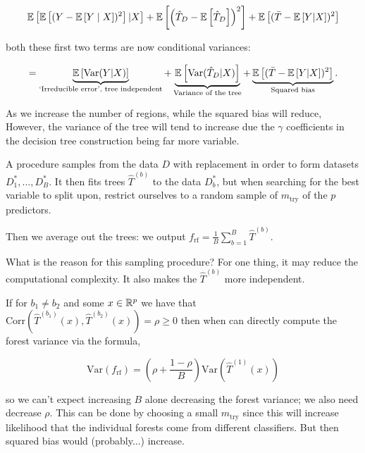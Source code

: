 \documentclass[11pt]{scrartcl}
\begin{document}
\begin{align}
    \mathbb{E} \left[ \mathbb{E} \left[ (Y-\mathbb{E} \left[ Y \mid X \right])^2 \right] | X \right] + \mathbb{E} \left[ \left(\hat{T}_D - \mathbb{E} \left[ \hat{T}_D \right]\right)^2 \right] + \mathbb{E} \left[ (\bar{T} - \mathbb{E} \left[ Y|X \right])^2 \right]
\end{align} 

both these first two terms are now conditional variances:

\begin{align}
    = \underbrace{\mathbb{E} \left[ \text{Var} (Y|X)  \right]}_ {\text{`Irreducible error', tree independent}} + \underbrace{\mathbb{E} \left[ \text{Var} (\hat{T}_D | X) \right]}_{\text{Variance of the tree}} + \underbrace{\mathbb{E} \left[  (\bar{T} - \mathbb{E} \left[ Y|X \right])^2  \right]}_{\text{Squared bias}}.
\end{align}

As we increase the number of regions, while the squared bias will reduce, However, the variance of the tree will tend to increase due the $\gamma$ coefficients in the decision tree construction being far more variable.

\begin{definition}
A  procedure samples from the data $D$ with replacement in order to form datasets $D_1^*, ... , D_B^*$. It then fits trees $\hat{T}^{(b)}$ to the data $D_b^*$, but when searching for the best variable to split upon, restrict ourselves to a random sample of $m_{\text{try}}$ of the $p$ predictors.

Then we average out the trees: we output $f_{\text{rf}} = \frac1B \sum_{b=1}^B \hat{T}^{(b)}$.
\end{definition}

What is the reason for this sampling procedure? For one thing, it may reduce the computational complexity. It also makes the $\hat{T}^{(b)}$ more independent.

If for $b_1 \neq b_2$ and some $x \in \mathbb R^p$ we have that $\text{Corr}(\hat{T}^{(b_1)}(x), \hat{T}^{(b_2)}(x))= \rho \ge 0$ then when can directly compute the forest variance via the formula,

\begin{equation}
    \text{Var}(f_{\text{rf}}) = \left(  \rho + \frac{1-\rho}{B} \right) \text{Var}(\hat{T}^{(1)}(x))
\end{equation}

so we can't expect increasing $B$ alone decreasing the forest variance; we also need decrease $\rho$. This can be done by choosing a small $m_\text{try}$ since this will increase likelihood that the individual forests come from different classifiers. But then squared bias would (probably...) increase.
\end{document}
